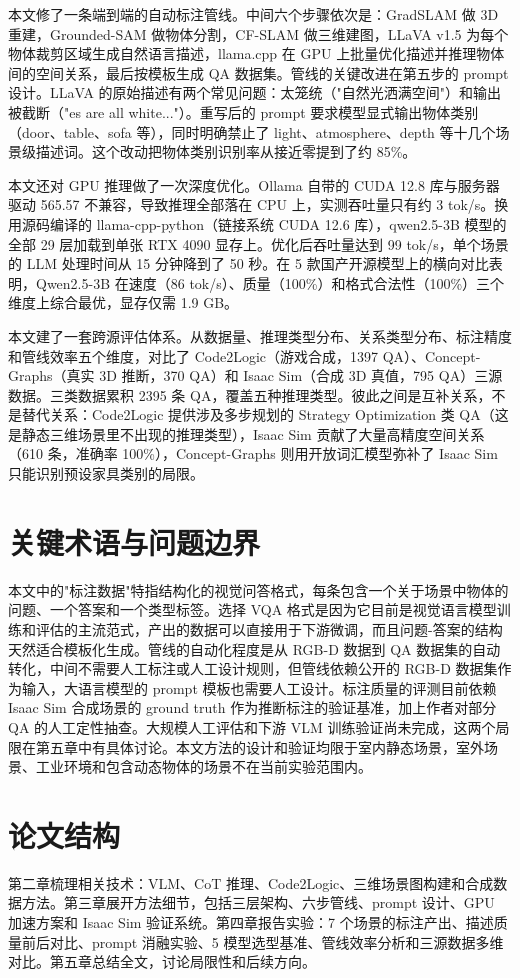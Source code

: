 本文修了一条端到端的自动标注管线。中间六个步骤依次是：GradSLAM 做 3D 重建，Grounded-SAM 做物体分割，CF-SLAM 做三维建图，LLaVA v1.5 为每个物体裁剪区域生成自然语言描述，llama.cpp 在 GPU 上批量优化描述并推理物体间的空间关系，最后按模板生成 QA 数据集。管线的关键改进在第五步的 prompt 设计。LLaVA 的原始描述有两个常见问题：太笼统（"自然光洒满空间"）和输出被截断（"es are all white..."）。重写后的 prompt 要求模型显式输出物体类别（door、table、sofa 等），同时明确禁止了 light、atmosphere、depth 等十几个场景级描述词。这个改动把物体类别识别率从接近零提到了约 85\%。

本文还对 GPU 推理做了一次深度优化。Ollama 自带的 CUDA 12.8 库与服务器驱动 565.57 不兼容，导致推理全部落在 CPU 上，实测吞吐量只有约 3 tok/s。换用源码编译的 llama-cpp-python（链接系统 CUDA 12.6 库），qwen2.5-3B 模型的全部 29 层加载到单张 RTX 4090 显存上。优化后吞吐量达到 99 tok/s，单个场景的 LLM 处理时间从 15 分钟降到了 50 秒。在 5 款国产开源模型上的横向对比表明，Qwen2.5-3B 在速度（86 tok/s）、质量（100\%）和格式合法性（100\%）三个维度上综合最优，显存仅需 1.9 GB。

本文建了一套跨源评估体系。从数据量、推理类型分布、关系类型分布、标注精度和管线效率五个维度，对比了 Code2Logic（游戏合成，1397 QA）、Concept-Graphs（真实 3D 推断，370 QA）和 Isaac Sim（合成 3D 真值，795 QA）三源数据。三类数据累积 2395 条 QA，覆盖五种推理类型。彼此之间是互补关系，不是替代关系：Code2Logic 提供涉及多步规划的 Strategy Optimization 类 QA（这是静态三维场景里不出现的推理类型），Isaac Sim 贡献了大量高精度空间关系（610 条，准确率 100\%），Concept-Graphs 则用开放词汇模型弥补了 Isaac Sim 只能识别预设家具类别的局限。

\section{关键术语与问题边界}

本文中的"标注数据"特指结构化的视觉问答格式，每条包含一个关于场景中物体的问题、一个答案和一个类型标签。选择 VQA 格式是因为它目前是视觉语言模型训练和评估的主流范式，产出的数据可以直接用于下游微调，而且问题-答案的结构天然适合模板化生成。管线的自动化程度是从 RGB-D 数据到 QA 数据集的自动转化，中间不需要人工标注或人工设计规则，但管线依赖公开的 RGB-D 数据集作为输入，大语言模型的 prompt 模板也需要人工设计。标注质量的评测目前依赖 Isaac Sim 合成场景的 ground truth 作为推断标注的验证基准，加上作者对部分 QA 的人工定性抽查。大规模人工评估和下游 VLM 训练验证尚未完成，这两个局限在第五章中有具体讨论。本文方法的设计和验证均限于室内静态场景，室外场景、工业环境和包含动态物体的场景不在当前实验范围内。

\section{论文结构}

第二章梳理相关技术：VLM、CoT 推理、Code2Logic、三维场景图构建和合成数据方法。第三章展开方法细节，包括三层架构、六步管线、prompt 设计、GPU 加速方案和 Isaac Sim 验证系统。第四章报告实验：7 个场景的标注产出、描述质量前后对比、prompt 消融实验、5 模型选型基准、管线效率分析和三源数据多维对比。第五章总结全文，讨论局限性和后续方向。

